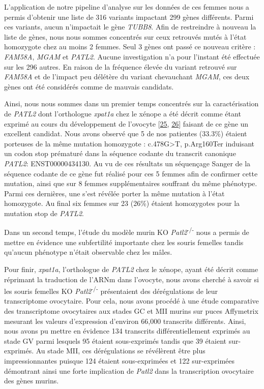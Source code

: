 \documentclass[12pt,a4paper,twoside]{ugathesis}
\begin{document}
L'application de notre pipeline d'analyse sur les données de ces femmes
nous a permis d'obtenir une liste de 316 variants impactant 299 gènes
différents. Parmi ces variants, aucun n'impactait le gène \emph{TUBB8}.
Afin de restreindre à nouveau la liste de gènes, nous nous sommes
concentrés sur ceux retrouvés mutés à l'état homozygote chez au moins 2
femmes. Seul 3 gènes ont passé ce nouveau critère : \emph{FAM58A},
\emph{MGAM} et \emph{PATL2}. Aucune investigation n'a pour l'instant été
effectuée sur les 296 autres. En raison de la fréquence élevée du
variant retrouvé sur \emph{FAM58A} et de l'impact peu délétère du
variant chevauchant \emph{MGAM}, ces deux gènes ont été considérés comme
de mauvais candidats.

Ainsi, nous nous sommes dans un premier temps concentrés sur la
caractérisation de \emph{PATL2} dont l'orthologue \emph{xpat1a} chez le
xénope a été décrit comme étant exprimé au cours du développement de
l'ovocyte {[}\protect\hyperlink{ref-Marnef2010}{25},
\protect\hyperlink{ref-Nakamura2010}{26}{]} faisant de ce gène un
excellent candidat. Nous avons observé que 5 de nos patientes (33.3\%)
étaient porteuses de la même mutation homozygote :
c.478G\textgreater{}T, p.Arg160Ter induisant un codon stop prématuré
dans la séquence codante du transcrit canonique \emph{PATL2}:
ENST00000434130. Au vu de ces résultats un séquençage Sanger de la
séquence codante de ce gène fut réalisé pour ces 5 femmes afin de
confirmer cette mutation, ainsi que sur 8 femmes supplémentaires
souffrant du même phénotype. Parmi ces dernières, une s'est révélée
porter la même mutation à l'état homozygote. Au final six femmes sur 23
(26\%) étaient homozygotes pour la mutation stop de \emph{PATL2}.

Dans un second temps, l'étude du modèle murin KO
\emph{Patl2}\textsuperscript{-/-} nous a permis de mettre en évidence
une subfertilité importante chez les souris femelles tandis qu'aucun
phénotype n'était observable chez les mâles.

Pour finir, \emph{xpat1a}, l'orthologue de \emph{PATL2} chez le xénope,
ayant été décrit comme réprimant la traduction de l'ARNm dans l'ovocyte,
nous avons cherché à savoir si les souris femelles KO
\emph{Patl2}\textsuperscript{-/-} présentaient des dérégulations de leur
transcriptome ovocytaire. Pour cela, nous avons procédé à une étude
comparative des transcriptome ovocytaires aux stades GC et MII murins
sur puces Affymetrix mesurant les valeurs d'expression d'environ 66,000
transcrits différents. Ainsi, nous avons pu mettre en évidence 134
transcrits différentiellement exprimés au stade GV parmi lesquels 95
étaient sous-exprimés tandis que 39 étaient sur-exprimés. Au stade MII,
ces dérégulations se révélèrent être plus impressionnantes puisque 124
étaient sous-exprimées et 122 sur-exprimées démontrant ainsi une forte
implication de \emph{Patl2} dans la transcription ovocytaire des gènes
murins.
\end{document}
